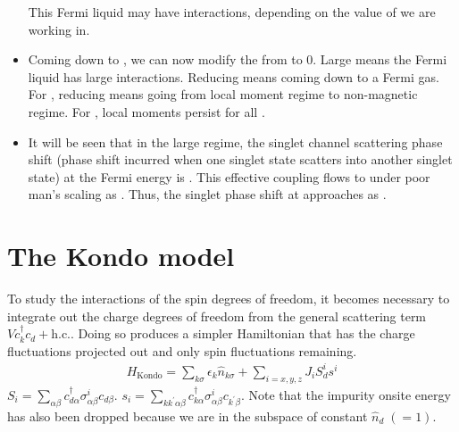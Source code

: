 \documentclass[12pt,twoside]{report}
\numberwithin{equation}{section}
\begin{document}
\begin{itemize}
This Fermi liquid may have interactions, depending on the value of  we are working in.
    \item Coming down to , we can now modify the  from \il{\infty} to 0.
Large  means the Fermi liquid has large interactions.
Reducing  means coming down to a Fermi gas.
For , reducing  means going from local moment regime to non-magnetic regime.
For , local moments persist for all .
    \item It will be seen that in the large  regime, the singlet channel scattering phase shift (phase shift incurred when one singlet state scatters into another singlet state) at the Fermi energy is .
This effective coupling  flows to \il{\infty} under poor man's scaling as .
Thus, the singlet phase shift at  approaches  as .
\end{itemize}

\section{The Kondo model}
To study the interactions of the spin degrees of freedom, it becomes necessary to integrate out the charge degrees of freedom from the general scattering term \(Vc^\dagger_k c_d + \text{h.c.}\). Doing so produces a simpler Hamiltonian that has the charge fluctuations projected out and only spin fluctuations remaining.
\begin{equation}\begin{aligned}
	H_\text{Kondo} = \sum_{k\sigma}\epsilon_k \hat n_{k\sigma} + \sum_{i=x,y,z} J_i S_d^i s^i
\end{aligned}\end{equation}
\(S_i = \sum_{\alpha \beta} c^\dagger_{d\alpha} \sigma^i_{\alpha\beta} c_{d \beta}\). \(s_i =\sum_{k k^\prime\alpha \beta} c^\dagger_{k\alpha} \sigma^i_{\alpha\beta} c_{k^\prime \beta}\).  Note that the impurity onsite energy has also been dropped because we are in the subspace of constant \(\hat n_d\;(= 1)\). 
\end{document}
